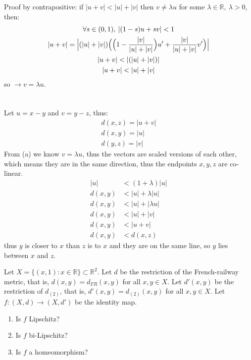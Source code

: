 \documentclass{jhwhw}
\begin{document}
\solution{}

\part{}

Proof by contrapositive: if $|u + v| < |u| + |v|$ then $v \neq \lambda u$ for some $\lambda \in \mathbb{R}, \: \lambda >0$, then:
\begin{gather}
\forall s \in (0,1), \: |(1-s)u + sv| < 1\\
|u + v| = \Big|(|u| + |v|) \Big{(} \Big{(}1 - \frac{|v|}{|u| + |v|}\Big{) }u' + \frac{|v|}{|u|+ |v|} v' \Big{)} \Big|\\
|u+v|< |(|u| + |v|)| \\
|u + v| < |u| + |v|
\end{gather}
so $\to v = \lambda u$.


\part{}
Let $u = x-y$ and $v = y-z$, thus:
\begin{gather}
d(x,z) = |u + v|\\
d(x,y) = |u|\\
d(y,z) = |v|
\end{gather}
From (a) we know $v = \lambda u$, thus the vectors are scaled versions of each other, which means they are in the same direction, thus the endpoints $x,y,z$ are co-linear.
\begin{align}
|u| &< (1+\lambda) |u|\\
d(x,y) &< |u| + \lambda |u|\\
d(x,y) &< |u| + |\lambda u|\\
d(x,y) &< |u| +|v|\\
d(x,y) &< |u+v|\\
d(x,y) &< d(x,z)
\end{align}
thus $y$ is closer to $x$ than $z$ is to $x$ and they are on the same line, so $y$ lies between $x$ and $z$.


\problem{}%
 Let $X = \{ (x,1):x\in\mathbb{R}\}\subset\mathbb{R}^2$. Let $d$ be the restriction of the French-railway metric, that is, $d(x,y) = d_{FR}(x,y)$ for all $x,y\in X$.  Let $d'(x,y)$ be the restriction of  $d_{(2)}$, that is, $d'(x,y) = d_{(2)}(x,y)$ for all $x,y\in X$.   Let $f:(X,d)\to (X,d')$ be the identity map.

\begin{enumerate}
	\item Is $f$ Lipschitz?
	\item Is $f$ bi-Lipschitz?
	\item Is $f$ a homeomorphism?
\end{enumerate}
\end{document}
